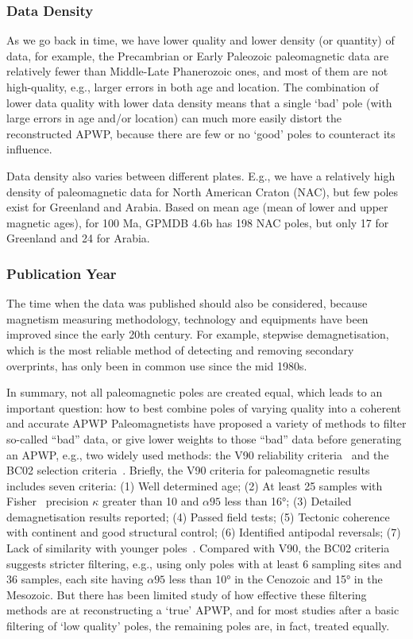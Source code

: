 \subsubsection{Data Density}

As we go back in time, we have lower quality and lower density (or quantity) of
data, for example, the Precambrian or Early Paleozoic paleomagnetic data are
relatively fewer than Middle-Late Phanerozoic ones, and most of them are not
high-quality, e.g., larger errors in both age and location. The combination of
lower data quality with lower data density means that a single `bad' pole (with
large errors in age and/or location) can much more easily distort the
reconstructed APWP, because there are few or no `good' poles to counteract its
influence.

Data density also varies between different plates. E.g., we have a relatively
high density of paleomagnetic data for North American Craton (NAC), but few
poles exist for Greenland and Arabia. Based on mean age (mean of lower and
upper magnetic ages), for 100 Ma, GPMDB 4.6b has 198 NAC poles, but
only 17 for Greenland and 24 for Arabia.

\subsubsection{Publication Year}

The time when the data was published should also be considered, because
magnetism measuring methodology, technology and equipments have been improved
since the early 20th century. For example, stepwise demagnetisation, which is
the most reliable method of detecting and removing secondary overprints, has
only been in common use since the mid 1980s.

In summary, not all paleomagnetic poles are created equal, which leads to an
important question: how to best combine poles of varying quality into a
coherent and accurate APWP\? Paleomagnetists have proposed a variety of methods
to filter so-called ``bad'' data, or give lower weights to those ``bad'' data
before generating an APWP, e.g., two widely used methods: the V90 reliability
criteria~\citep{v90} and the BC02 selection criteria~\citep{B02}. Briefly, the
V90 criteria for paleomagnetic results includes seven criteria: (1) Well
determined age; (2) At least 25 samples with Fisher~\citep{F53} precision
$\kappa$ greater than 10 and $\alpha95$ less than 16°; (3) Detailed
demagnetisation results reported; (4) Passed field tests; (5) Tectonic
coherence with continent and good structural control; (6) Identified antipodal
reversals; (7) Lack of similarity with younger poles~\citep{T92}.
Compared with V90, the BC02 criteria suggests stricter filtering, e.g., using
only poles with at least 6 sampling sites and 36 samples, each site having
$\alpha95$ less than 10° in the Cenozoic and 15° in the Mesozoic. But there has
been limited study of how effective these filtering methods are at
reconstructing a `true' APWP, and for most studies after a basic filtering of
`low quality' poles, the remaining poles are, in fact, treated equally.



